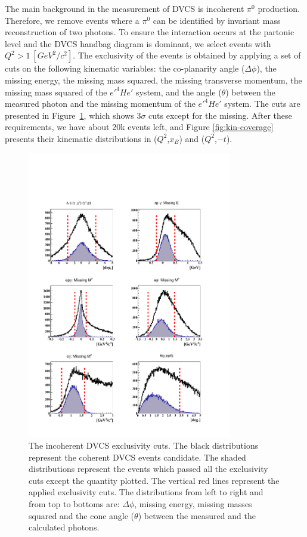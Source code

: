 \documentclass[twocolumn,nofootinbib,showpacs,prl,superscriptaddress,secnumarabic,amssymb,nobibnotes,aps,floatfix]{revtex4}
\begin{document}
The main background in the measurement of DVCS is incoherent $\pi^{0}$ 
production. Therefore, we remove events where a $\pi^{0}$ can be identified by 
invariant mass reconstruction of two photons. To ensure the interaction occurs 
at the partonic level and the DVCS handbag diagram is dominant, we select 
events with $Q^{2}>1~[GeV^{2}/c^{2}]$. The exclusivity of the events is 
obtained by applying a set of cuts on the following kinematic variables: the 
co-planarity angle ($\Delta \phi$), the missing energy, the missing mass 
squared, the missing transverse momentum, the missing mass squared of the 
$e'^4He'$ system, and the angle ($\theta$) between the measured photon and the 
missing momentum of the $e'^4He'$ system. The cuts are presented in 
Figure~\ref{fig:kin-cuts}, which shows 3$\sigma$ cuts except for the missing.  
After these requirements, we have about 20k events left, and Figure 
\ref{fig:kin-coverage} presents their
kinematic distributions in ($Q^{2}$,$x_{B}$) and ($Q^{2}$,$-t$).

\begin{figure}[tb]
\includegraphics[width=8.9cm]{figs/incoh_exc_cuts_final.pdf}
\caption{The incoherent DVCS exclusivity cuts. The black distributions 
   represent the coherent DVCS events candidate. The shaded distributions 
   represent the events which passed all the exclusivity cuts except the 
   quantity plotted. The vertical red lines represent the applied exclusivity 
cuts. The distributions from left to right and from top to bottoms are: $\Delta 
\phi$, missing energy, missing masses squared and the cone angle ($\theta$) 
between the measured and the calculated photons.}
\label{fig:kin-cuts}
\end{figure}
 
\end{document}
